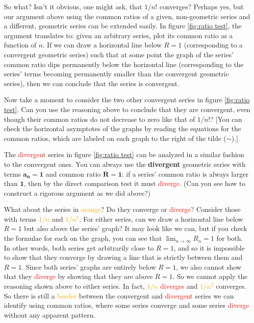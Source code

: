 \documentclass{myarticle}
\theoremstyle{nospace}
\newtheorem{old series theorem}{Theorem}
\newenvironment{series theorem}
{\begin{mdframed}\begin{old series theorem}}
    {\end{old series theorem}\end{mdframed}}
\begin{document}
So what? Isn't it obvious, one might ask, that
\textcolor{nicegreen}{$1/n!$} converges? Perhaps yes, but our argument
above using the common ratios of a given, non-geometric series and a
different, geometric series can be extended easily. In figure
\ref{fig:ratio test}, the argument translates to: given an arbitrary
series, plot its common ratio as a function of $n$. If we can draw a
horizontal line below $R = 1$ (corresponding to a
\textcolor{nicegreen}{convergent} geometric series) such that at some
point the graph of the series' common ratio dips permanently below the
horizontal line (corresponding to the series' terms becoming
permanently smaller than the \textcolor{nicegreen}{convergent}
geometric series), then we can conclude that the series is
\textcolor{nicegreen}{convergent}.

Now take a moment to consider the two other
\textcolor{nicegreen}{convergent} series in figure \ref{fig:ratio
  test}. Can you use the reasoning above to conclude that they are
\textcolor{nicegreen}{convergent}, even though their common ratios do
not decrease to zero like that of \textcolor{nicegreen}{$1/n!$}? [You
can check the horizontal asymptotes of the graphs by reading the
equations for the common ratios, which are labeled on each graph to
the right of the tilde ($\sim$).]

The \textcolor{red}{divergent} series in figure \ref{fig:ratio test}
can be analyzed in a similar fashion to the
\textcolor{nicegreen}{convergent} ones. You can always use the
\textbf{divergent} geometric series with terms $\mathbf{a_n = 1}$ and
common ratio $\mathbf{R = 1}$: if a series' common ratio is always
larger than $\mathbf{1}$, then by the direct comparison test it must
\textcolor{red}{diverge}. (Can you see how to construct a rigorous
argument as we did above?)

What about the series in \textcolor{orange}{orange}? Do they
\textcolor{nicegreen}{converge} or \textcolor{red}{diverge}? Consider
those with terms \textcolor{orange}{$1/n$} and
\textcolor{orange}{$1/n^2$}. For either series, can we draw a
horizontal line below $R = 1$ but also above the series' graph? It may
look like we can, but if you check the formulae for each on the graph,
you can see that $\lim_{n \to \infty} R_n = 1$ for both. In other
words, both series get arbitrarily close to $R = 1$, and so it is
impossible to show that they \textcolor{nicegreen}{converge} by
drawing a line that is strictly between them and $R = 1$. Since both
series' graphs are entirely below $R = 1$, we also cannot show that
they \textcolor{red}{diverge} by showing that they are above $R = 1$.
So we cannot apply the reasoning shown above to either series. In
fact, \textcolor{orange}{$1/n$} \textcolor{red}{diverges} and
\textcolor{orange}{$1/n^2$} \textcolor{nicegreen}{converges}. So there
is still a \textcolor{orange}{border} between the
\textcolor{nicegreen}{convergent} and \textcolor{red}{divergent}
series we can identify using common ratios, where some series
\textcolor{nicegreen}{converge} and some series
\textcolor{red}{diverge} without any apparent pattern.
\end{document}
